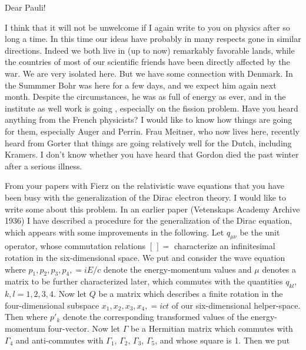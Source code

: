 \date{October 1940}

Dear Pauli!

I think that it will not be unwelcome if I again write to you on physics after so long a time. In this time our ideas have probably in many respects gone in similar directions. Indeed we both live in (up to now) remarkably favorable lands, while the countries of most of our scientific friends have been directly affected by the war. We are very isolated here. But we have some connection with Denmark. In the Summmer Bohr was here for a few days, and we expect him again next month. Despite the circumstances, he was as full of energy as ever, and in the institute as well work is going , especially on the fission problem. Have you heard anything from the French physicists? I would like to know how things are going for them, especially Auger and Perrin. Frau Meitner, who now lives here, recently heard from Gorter that things are going relatively well for the Dutch, including Kramers. I don't know whether you have heard that Gordon died the past winter after a serious illness.

From your papers with Fierz on the relativistic wave equations that you have been busy with the generalization of the Dirac electron theory. I would like to write some about this problem. In an earlier paper (Vetenskaps Academy Archive 1936) I have described a procedure for the generalization of the Dirac equation, which appears with some improvements in the following. Let $q_{\mu\nu}$ be the unit operator, whose commutation relations $[\,]=$ characterize an infinitesimal rotation in the six-dimensional space. We put
and consider the wave equation
where $p_1, p_2, p_3, p_4, = iE/c$ denote the energy-momentum values and $\mu$ denotes a matrix to be further characterized later, which commutes with the quantities $q_{kl}$, $k,l=1,2,3,4$. Now let $Q$ be a matrix which describes a finite rotation in the four-dimensional subspace $x_1,x_2,x_3,x_4,=ict$ of our six-dimensional helper-space. Then
where $p'_k$ denote the corresponding transformed values of the energy-momentum four-vector. Now let $\Gamma$ be a Hermitian matrix which commutes with $\Gamma_4$ and anti-commutes with $\Gamma_1$, $\Gamma_2$, $\Gamma_3$, $\Gamma_5$, and whose square is 1. Then we put

